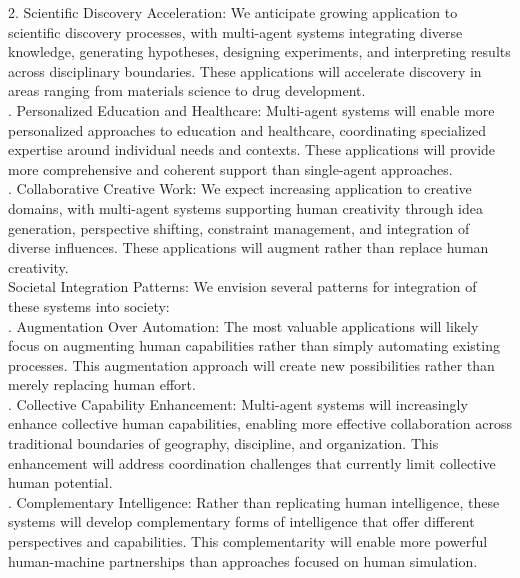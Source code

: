 2. Scientific Discovery Acceleration: We anticipate growing application to scientific discovery processes, with multi-agent systems integrating diverse knowledge, generating hypotheses, designing experiments, and interpreting results across disciplinary boundaries. These applications will accelerate discovery in areas ranging from materials science to drug development.\\ . Personalized Education and Healthcare: Multi-agent systems will enable more personalized approaches to education and healthcare, coordinating specialized expertise around individual needs and contexts. These applications will provide more comprehensive and coherent support than single-agent approaches.\\ . Collaborative Creative Work: We expect increasing application to creative domains, with multi-agent systems supporting human creativity through idea generation, perspective shifting, constraint management, and integration of diverse influences. These applications will augment rather than replace human creativity.\\ \newline
Societal Integration Patterns: We envision several patterns for integration of these systems into society:\\ . Augmentation Over Automation: The most valuable applications will likely focus on augmenting human capabilities rather than simply automating existing processes. This augmentation approach will create new possibilities rather than merely replacing human effort.\\ . Collective Capability Enhancement: Multi-agent systems will increasingly enhance collective human capabilities, enabling more effective collaboration across traditional boundaries of geography, discipline, and organization. This enhancement will address coordination challenges that currently limit collective human potential.\\ . Complementary Intelligence: Rather than replicating human intelligence, these systems will develop complementary forms of intelligence that offer different perspectives and capabilities. This complementarity will enable more powerful human-machine partnerships than approaches focused on human simulation.\\ \newline
